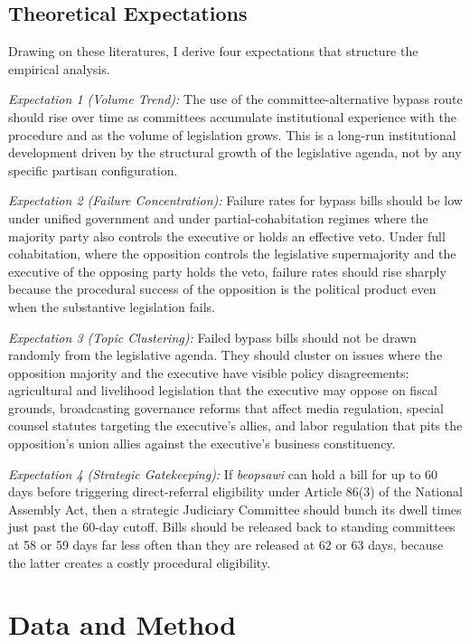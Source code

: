 \documentclass[11pt]{article}
\begin{document}
\subsection{Theoretical Expectations}

Drawing on these literatures, I derive four expectations that structure the empirical analysis.

\textit{Expectation 1 (Volume Trend):} The use of the committee-alternative bypass route should rise over time as committees accumulate institutional experience with the procedure and as the volume of legislation grows. This is a long-run institutional development driven by the structural growth of the legislative agenda, not by any specific partisan configuration.

\textit{Expectation 2 (Failure Concentration):} Failure rates for bypass bills should be low under unified government and under partial-cohabitation regimes where the majority party also controls the executive or holds an effective veto. Under full cohabitation, where the opposition controls the legislative supermajority and the executive of the opposing party holds the veto, failure rates should rise sharply because the procedural success of the opposition is the political product even when the substantive legislation fails.

\textit{Expectation 3 (Topic Clustering):} Failed bypass bills should not be drawn randomly from the legislative agenda. They should cluster on issues where the opposition majority and the executive have visible policy disagreements: agricultural and livelihood legislation that the executive may oppose on fiscal grounds, broadcasting governance reforms that affect media regulation, special counsel statutes targeting the executive's allies, and labor regulation that pits the opposition's union allies against the executive's business constituency.

\textit{Expectation 4 (Strategic Gatekeeping):} If \textit{beopsawi} can hold a bill for up to 60 days before triggering direct-referral eligibility under Article 86(3) of the National Assembly Act, then a strategic Judiciary Committee should bunch its dwell times just past the 60-day cutoff. Bills should be released back to standing committees at 58 or 59 days far less often than they are released at 62 or 63 days, because the latter creates a costly procedural eligibility.

\section{Data and Method}
\end{document}

